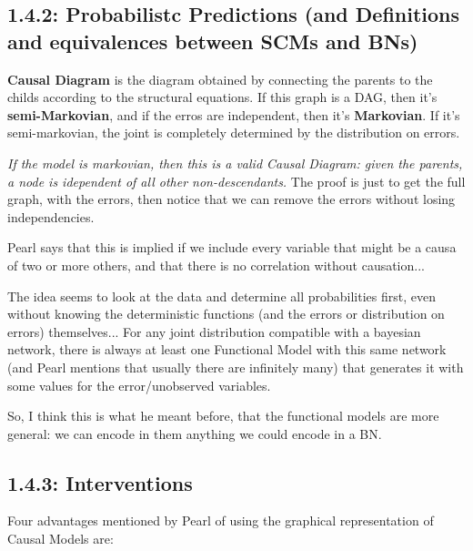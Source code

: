 \subsection{1.4.2: Probabilistc Predictions (and Definitions and equivalences between SCMs and BNs)}

\textbf{Causal Diagram} is the diagram obtained by connecting the parents to the childs according to the structural equations. If this graph is a DAG, then it's \textbf{semi-Markovian}, and if the erros are independent, then it's \textbf{Markovian}. If it's semi-markovian, the joint is completely determined by the distribution on errors.

\textit{If the model is markovian, then this is a valid Causal Diagram: given the parents, a node is idependent of all other non-descendants.} The proof is just to get the full graph, with the errors, then notice that we can remove the errors without losing independencies.

Pearl says that this is implied if we include every variable that might be a causa of two or more others, and that there is no correlation without causation...

The idea seems to look at the data and determine all probabilities first, even without knowing the deterministic functions (and the errors or distribution on errors) themselves... For any joint distribution compatible with a bayesian network, there is always at least one Functional Model with this same network (and Pearl mentions that usually there are infinitely many) that generates it with some values for the error/unobserved variables.

So, I think this is what he meant before, that the functional models are more general: we can encode in them anything we could encode in a BN.

\subsection{1.4.3: Interventions}


Four advantages mentioned by Pearl of using the graphical representation of Causal Models are:

